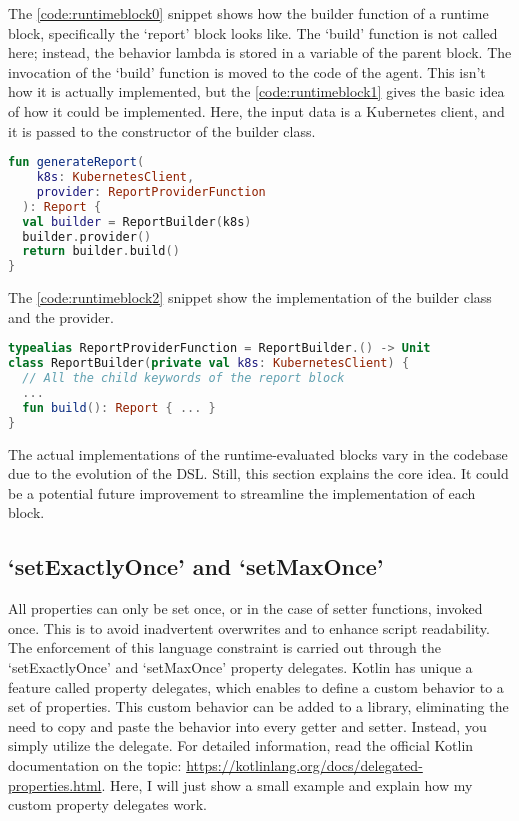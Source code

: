 The \ref{code:runtimeblock0} snippet shows how the builder function of a runtime block, specifically the `report' block looks like. The `build' function is not called here; instead, the behavior lambda is stored in a variable of the parent block. The invocation of the `build' function is moved to the code of the agent. This isn't how it is actually implemented, but the \ref{code:runtimeblock1} gives the basic idea of how it could be implemented. Here, the input data is a Kubernetes client, and it is passed to the constructor of the builder class.

\begin{minipage}{\linewidth}
\begin{lstlisting}[caption={Build a report},language=Kotlin,label=code:runtimeblock1]
fun generateReport(
    k8s: KubernetesClient, 
    provider: ReportProviderFunction
  ): Report {
  val builder = ReportBuilder(k8s)
  builder.provider()
  return builder.build()
}
\end{lstlisting}
\end{minipage}

The \ref{code:runtimeblock2} snippet show the implementation of the builder class and the provider.

\begin{minipage}{\linewidth}
\begin{lstlisting}[caption={Report builder class and provider},language=Kotlin,label=code:runtimeblock2]
typealias ReportProviderFunction = ReportBuilder.() -> Unit
class ReportBuilder(private val k8s: KubernetesClient) {
  // All the child keywords of the report block
  ...
  fun build(): Report { ... }
}
\end{lstlisting}
\end{minipage}

The actual implementations of the runtime-evaluated blocks vary in the codebase due to the evolution of the DSL. Still, this section explains the core idea. It could be a potential future improvement to streamline the implementation of each block.

\subsection{`setExactlyOnce' and `setMaxOnce'}

All properties can only be set once, or in the case of setter functions, invoked once. This is to avoid inadvertent overwrites and to enhance script readability. The enforcement of this language constraint is carried out through the `setExactlyOnce' and `setMaxOnce' property delegates. Kotlin has unique a feature called property delegates, which enables to define a custom behavior to a set of properties. This custom behavior can be added to a library, eliminating the need to copy and paste the behavior into every getter and setter. Instead, you simply utilize the delegate. For detailed information, read the official Kotlin documentation on the topic: \url{https://kotlinlang.org/docs/delegated-properties.html}. Here, I will just show a small example and explain how my custom property delegates work.

